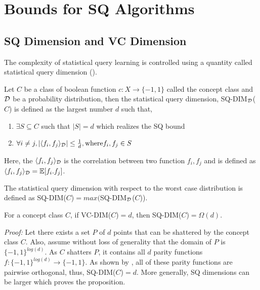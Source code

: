 \section{Bounds for SQ Algorithms}
\label{sec:bounds}

\subsection{SQ Dimension and VC Dimension}
The complexity of statistical query learning is controlled using a quantity called statistical query dimension (\cite{blum_weakly_1994}).

\begin{definition}
Let $C$ be a class of boolean function $c: X \xrightarrow{} \{-1, 1\}$ called the concept class and $\mathcal{D}$ be a probability distribution, then the statistical query dimension, SQ-DIM$_{\mathcal{D}}$($C$) is defined as the largest number $d$ such that,
    \begin{enumerate}
        \item $\exists S \subseteq C$ such that $|S| = d$ which realizes the SQ bound
        \item $\forall i \neq j, |\langle f_i, f_j \rangle_{\mathcal{D}}| \leq \frac{1}{d}, \text{where} f_i, f_j \in S$
    \end{enumerate}
\end{definition}

Here, the $\langle f_i, f_j \rangle_{\mathcal{D}}$ is the correlation between two function $f_i, f_j$ and is defined as $\langle f_i, f_j \rangle_{\mathcal{D}} = \mathbb E[f_i.f_j]$.

The statistical query dimension with respect to the worst case distribution is defined as SQ-DIM($C$)$ = max($SQ-DIM$_{\mathcal{D}}$($C$)).

\begin{proposition}
    For a concept class $C$, if VC-DIM($C$)$ = d$, then SQ-DIM($C$)$ = \Omega(d)$.
\end{proposition}

\textit{Proof:} Let there exists a set $P$ of $d$ points that can be shattered by the concept class $C$. Also, assume without loss of generality that the domain of $P$ is $\{-1, 1\}^{log(d)}$. As $C$ shatters $P$, it contains all $d$ parity functions $f: \{-1, 1\}^{log(d)} \xrightarrow{} \{-1, 1\}$. As shown by \cite{odonnell_analysis_2014}, all of these parity functions are pairwise orthogonal, thus, SQ-DIM($C$)$ = d$. More generally, SQ dimensions can be larger which proves the proposition.

